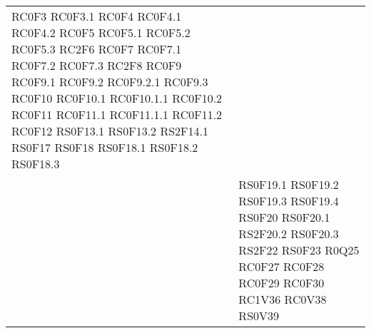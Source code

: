 \begin{center}
\begin{longtable}{|p{5cm}|p{5cm}|}
 \newline RC0F3 \newline RC0F3.1 \newline RC0F4 \newline RC0F4.1 \newline RC0F4.2 \newline RC0F5 \newline RC0F5.1 \newline RC0F5.2 \newline RC0F5.3 \newline RC2F6 \newline RC0F7 \newline RC0F7.1 \newline RC0F7.2 \newline RC0F7.3 \newline RC2F8 \newline RC0F9 \newline RC0F9.1 \newline RC0F9.2 \newline RC0F9.2.1 \newline RC0F9.3 \newline RC0F10 \newline RC0F10.1 \newline RC0F10.1.1 \newline RC0F10.2 \newline RC0F11 \newline RC0F11.1 \newline RC0F11.1.1 \newline RC0F11.2 \newline RC0F12 \newline RS0F13.1 \newline RS0F13.2 \newline RS2F14.1 \newline RS0F17 \newline RS0F18 \newline RS0F18.1 \newline RS0F18.2 \newline RS0F18.3 \\ & RS0F19.1 \newline RS0F19.2 \newline RS0F19.3 \newline RS0F19.4 \newline RS0F20 \newline RS0F20.1 \newline RS2F20.2 \newline RS0F20.3 \newline RS2F22 \newline RS0F23 \newline R0Q25 \newline RC0F27 \newline RC0F28 \newline RC0F29 \newline RC0F30 \newline RC1V36 \newline RC0V38 \newline RS0V39 \\\hline

\end{longtable}
\end{center}

